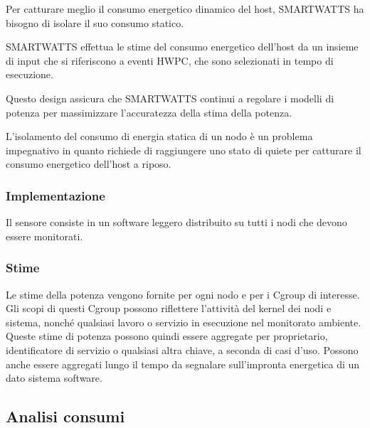\documentclass[a4paper, 11pt]{article}
\begin{document}
Per catturare meglio il consumo energetico dinamico del host, SMARTWATTS ha bisogno di isolare il suo consumo statico.

SMARTWATTS effettua le stime del consumo energetico dell'host da un insieme di input che si riferiscono a eventi HWPC, che sono selezionati in tempo di esecuzione.

Questo design assicura che SMARTWATTS continui a regolare i
modelli di potenza per massimizzare l'accuratezza della stima della potenza.

L'isolamento del consumo di energia statica di un nodo è un
problema impegnativo in quanto richiede di raggiungere uno stato di quiete per catturare il consumo energetico dell'host a riposo.

\subsubsection{Implementazione}
Il sensore consiste in un software leggero distribuito su tutti i nodi che devono essere monitorati.

\subsubsection{Stime}
Le stime della potenza vengono fornite per ogni nodo e per i Cgroup di interesse. Gli scopi di questi Cgroup possono riflettere l'attività del kernel dei nodi e sistema, nonché qualsiasi lavoro o servizio in esecuzione nel monitorato ambiente. Queste stime di potenza possono quindi essere aggregate per proprietario, identificatore di servizio o qualsiasi altra chiave, a seconda di casi d'uso. Possono anche essere aggregati lungo il tempo da segnalare sull'impronta energetica di un dato sistema software.
\subsection{Analisi consumi}
\end{document}

